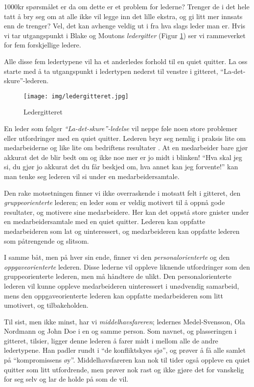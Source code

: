 \documentclass[a4paper, 12pt]{article}  %
\begin{document}
1000kr spørsmålet er da om dette er et problem for lederne? 
Trenger de i det hele tatt å bry seg om at alle ikke vil legge inn det lille ekstra, og gi litt mer innsats enn de trenger? 
Vel, det kan avhenge veldig ut i fra hva slags leder man er. 
Hvis vi tar utgangspunkt i Blake og Moutons \emph{ledergitter} (Figur \ref{fig:ledergitter}) ser vi rammeverket for fem forskjellige ledere.

Alle disse fem ledertypene vil ha et anderledes forhold til en quiet quitter. 
La oss starte med å ta utgangspunkt i ledertypen nederst til venstre i gitteret, ``La-det-skure''-lederen.

\begin{figure}[H]
  \centering
  \texttt{[image: img/ledergitteret.jpg]}
  \caption{Ledergitteret \parencite[63]{ledelse}}
  \label{fig:ledergitter}
\end{figure}

En leder som følger \emph{``La-det-skure''-ledelse} vil neppe føle noen store problemer eller utfordringer med en quiet quitter. 
Lederen bryr seg nemlig i praksis lite om medarbeiderne og like lite om bedriftens resultater \parencite{ledelse}. 
At en medarbeider bare gjør akkurat det de blir bedt om og ikke noe mer er jo midt i blinken! 
``Hva skal jeg si, du gjør jo akkurat det du får beskjed om, hva annet kan jeg forvente!'' kan man tenke seg lederen vil si under en medarbeidersamtale.

Den rake motsetningen finner vi ikke overraskende i motsatt felt i gitteret, den \emph{gruppeorienterte} lederen; 
en leder som er veldig motivert til å oppnå gode resultater, og motivere sine medarbeidere. 
Her kan det oppstå store gnister under en medarbeidersamtale med en quiet quitter. 
Lederen kan oppfatte medarbeideren som lat og uinteressert, og medarbeideren kan oppfatte lederen som påtrengende og slitsom.

I samme båt, men på hver sin ende, finner vi den \emph{personalorienterte} og den \emph{oppgaveorienterte} lederen. 
Disse lederne vil oppleve liknende utfordringer som den gruppeorienterte lederen, men må håndtere de ulikt. 
Den personalorienterte lederen vil kunne oppleve medarbeideren uinteressert i unødvendig samarbeid, mens den oppgaveorienterte lederen kan oppfatte medarbeideren som litt umotivert, og tilbakeholden. 

Til sist, men ikke minst, har vi \emph{middelhavsfareren}; ledernes Medel-Svensson, Ola Nordmann og John Doe i en og samme person. 
Som navnet, og plasseringen i gitteret, tilsier, ligger denne lederen å farer midt i mellom alle de andre ledertypene. 
Han padler rundt i ``de konfliktskyes sjø'', og prøver å få alle samlet på ``kompromissens øy''. 
Middelhavsfareren kan nok til tider også oppleve en quiet quitter som litt utfordrende, men prøver nok rast og ikke gjøre det for vanskelig for seg selv og lar de holde på som de vil.
\end{document}
